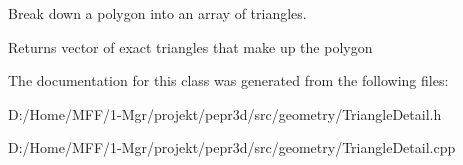 Break down a polygon into an array of triangles. 

\begin{DoxyReturn}{Returns}
vector of exact triangles that make up the polygon 
\end{DoxyReturn}


The documentation for this class was generated from the following files\+:\begin{DoxyCompactItemize}
\item 
D\+:/\+Home/\+M\+F\+F/1-\/\+Mgr/projekt/pepr3d/src/geometry/Triangle\+Detail.\+h\item 
D\+:/\+Home/\+M\+F\+F/1-\/\+Mgr/projekt/pepr3d/src/geometry/Triangle\+Detail.\+cpp\end{DoxyCompactItemize}
